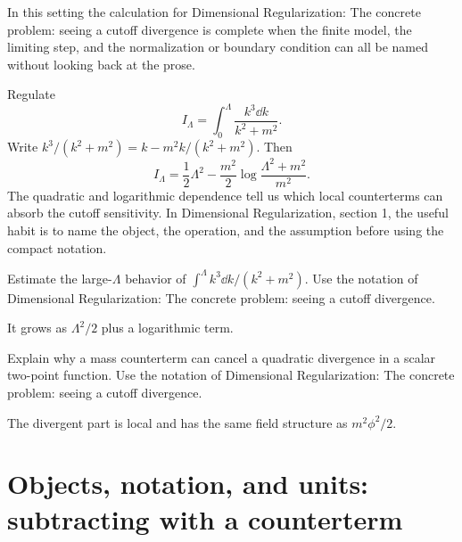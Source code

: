 In this setting the calculation for Dimensional Regularization: The concrete problem: seeing a cutoff divergence is complete when the finite model, the limiting step, and the normalization or boundary condition can all be named without looking back at the prose.




\begin{example}
Regulate
\[
  I_\Lambda=\int_0^\Lambda\frac{k^3\dd k}{k^2+m^2}.
\]
Write \(k^3/(k^2+m^2)=k-m^2k/(k^2+m^2)\).  Then
\[
  I_\Lambda=\frac12\Lambda^2-\frac{m^2}{2}\log\frac{\Lambda^2+m^2}{m^2}.
\]
The quadratic and logarithmic dependence tell us which local counterterms can absorb the cutoff sensitivity.  In Dimensional Regularization, section 1, the useful habit is to name the object, the operation, and the assumption before using the compact notation.
\end{example}



\begin{exercise}
Estimate the large-\(\Lambda\) behavior of \(\int^\Lambda k^3\dd k/(k^2+m^2)\).  Use the notation of Dimensional Regularization: The concrete problem: seeing a cutoff divergence.
\begin{answer}
It grows as \(\Lambda^2/2\) plus a logarithmic term.
\end{answer}
\end{exercise}

\begin{exercise}
Explain why a mass counterterm can cancel a quadratic divergence in a scalar two-point function.  Use the notation of Dimensional Regularization: The concrete problem: seeing a cutoff divergence.
\begin{answer}
The divergent part is local and has the same field structure as \(m^2\phi^2/2\).
\end{answer}
\end{exercise}



\section{Objects, notation, and units: subtracting with a counterterm}














